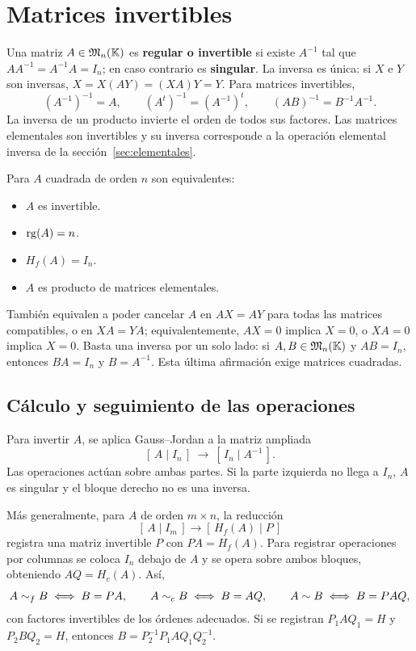 \section{Matrices invertibles}
\label{sec:inversas}

Una matriz $A\in\mathfrak{M}_n(\mathbb{K})$ es \textbf{regular o invertible} si existe
$A^{-1}$ tal que $AA^{-1}=A^{-1}A=I_n$; en caso contrario es
\textbf{singular}. La inversa es única: si $X$ e $Y$ son inversas,
$X=X(AY)=(XA)Y=Y$. Para matrices invertibles,
\[
 (A^{-1})^{-1}=A,\qquad (A^t)^{-1}=(A^{-1})^t,\qquad
 (AB)^{-1}=B^{-1}A^{-1}.
\]
La inversa de un producto invierte el orden de todos sus factores.
Las matrices elementales son invertibles y su inversa corresponde a
la operación elemental inversa de la sección~\ref{sec:elementales}.

Para $A$ cuadrada de orden $n$ son equivalentes:
\begin{itemize}
 \item $A$ es invertible.
 \item $\operatorname{rg}(A)=n$.
 \item $H_f(A)=I_n$.
 \item $A$ es producto de matrices elementales.
\end{itemize}
También equivalen a poder cancelar $A$ en $AX=AY$ para todas las matrices
compatibles, o en $XA=YA$; equivalentemente, $AX=0$ implica $X=0$,
o $XA=0$ implica $X=0$. Basta una inversa por un solo lado:
si $A,B\in\mathfrak{M}_n(\mathbb{K})$ y $AB=I_n$, entonces $BA=I_n$ y $B=A^{-1}$.
Esta última afirmación exige matrices cuadradas.

\subsection*{Cálculo y seguimiento de las operaciones}

Para invertir $A$, se aplica Gauss--Jordan a la matriz ampliada
\[
 [\,A\mid I_n\,]\ \longrightarrow\ [\,I_n\mid A^{-1}\,].
\]
Las operaciones actúan sobre ambas partes. Si la parte izquierda no llega
a $I_n$, $A$ es singular y el bloque derecho no es una inversa.

Más generalmente, para $A$ de orden $m\times n$, la reducción
\[
 [\,A\mid I_m\,]\longrightarrow[\,H_f(A)\mid P\,]
\]
registra una matriz invertible $P$ con $PA=H_f(A)$. Para registrar
operaciones por columnas se coloca $I_n$ debajo de $A$ y se opera sobre
ambos bloques, obteniendo $AQ=H_c(A)$. Así,
\[
 A\sim_f B\iff B=PA,\qquad A\sim_c B\iff B=AQ,\qquad
 A\sim B\iff B=PAQ,
\]
con factores invertibles de los órdenes adecuados. Si se registran
$P_1AQ_1=H$ y $P_2BQ_2=H$, entonces
$B=P_2^{-1}P_1A Q_1Q_2^{-1}$.

